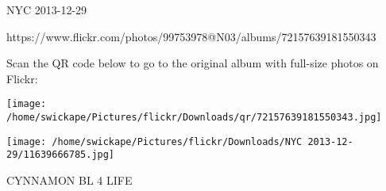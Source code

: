 \documentclass[10pt,letterpaper]{article}
\begin{document}
NYC 2013-12-29

https://www.flickr.com/photos/99753978@N03/albums/72157639181550343

Scan the QR code below to go to the original album with full-size photos on Flickr:

\texttt{[image: /home/swickape/Pictures/flickr/Downloads/qr/72157639181550343.jpg]}
\pagebreak

\texttt{[image: /home/swickape/Pictures/flickr/Downloads/NYC 2013-12-29/11639666785.jpg]}

CYNNAMON BL 4 LIFE
\pagebreak
\end{document}
